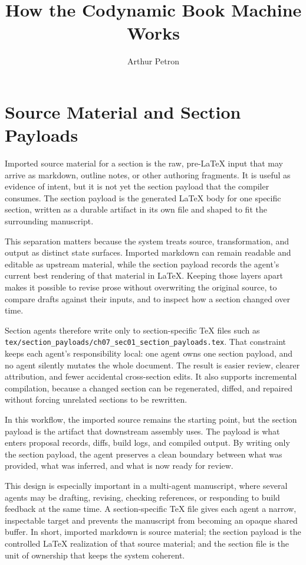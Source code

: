 \documentclass[11pt]{article}
\title{How the Codynamic Book Machine Works}
\author{Arthur Petron}
\begin{document}
\section*{Source Material and Section Payloads}

Imported source material for a section is the raw, pre-LaTeX input that may arrive as markdown, outline notes, or other authoring fragments. It is useful as evidence of intent, but it is not yet the section payload that the compiler consumes. The section payload is the generated LaTeX body for one specific section, written as a durable artifact in its own file and shaped to fit the surrounding manuscript.

This separation matters because the system treats source, transformation, and output as distinct state surfaces. Imported markdown can remain readable and editable as upstream material, while the section payload records the agent's current best rendering of that material in LaTeX. Keeping those layers apart makes it possible to revise prose without overwriting the original source, to compare drafts against their inputs, and to inspect how a section changed over time.

Section agents therefore write only to section-specific TeX files such as \texttt{tex/section\_payloads/ch07\_sec01\_section\_payloads.tex}. That constraint keeps each agent's responsibility local: one agent owns one section payload, and no agent silently mutates the whole document. The result is easier review, clearer attribution, and fewer accidental cross-section edits. It also supports incremental compilation, because a changed section can be regenerated, diffed, and repaired without forcing unrelated sections to be rewritten.

In this workflow, the imported source remains the starting point, but the section payload is the artifact that downstream assembly uses. The payload is what enters proposal records, diffs, build logs, and compiled output. By writing only the section payload, the agent preserves a clean boundary between what was provided, what was inferred, and what is now ready for review.

This design is especially important in a multi-agent manuscript, where several agents may be drafting, revising, checking references, or responding to build feedback at the same time. A section-specific TeX file gives each agent a narrow, inspectable target and prevents the manuscript from becoming an opaque shared buffer. In short, imported markdown is source material; the section payload is the controlled LaTeX realization of that source material; and the section file is the unit of ownership that keeps the system coherent.
\end{document}

